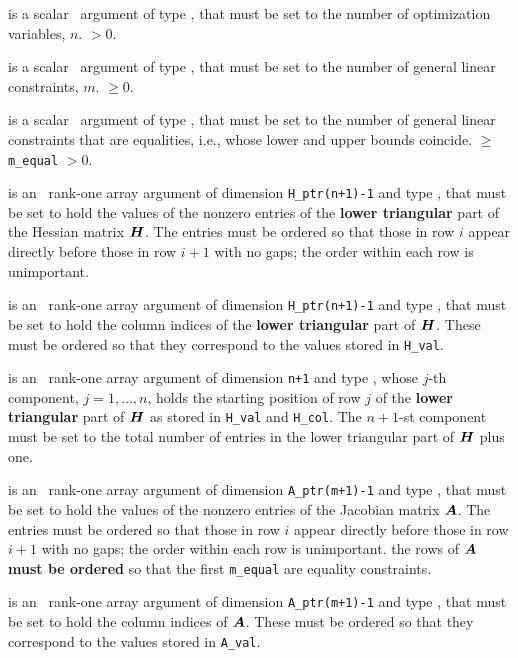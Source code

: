 \documentclass{galahad}
\begin{document}
\begin{description}
 is a scalar \intentin\ argument of type \integer,
 that must be set  to the number of optimization variables, $n$.
 $> 0$.

 is a scalar \intentin\ argument of type \integer,
 that must be set to the number of general linear constraints, $m$.
 $\geq 0$.

 is a scalar \intentin\ argument of type \integer,
 that must be set to the number of general linear constraints that
 are equalities, i.e., whose lower and upper bounds coincide.
 $\geq$ {\tt m\_equal} $> 0$.

 is an \intentin\  rank-one array argument
of dimension {\tt H\_ptr(n+1)-1} and type \realdp, that must be set
to hold the values of the nonzero entries of the {\bf lower triangular} part
of the Hessian matrix ${\bm{H}}$. The entries must be ordered so that those
in row $i$ appear directly before those in row $i+1$ with no gaps;
the order within each row is unimportant.

 is an \intentin\ rank-one array argument
of dimension {\tt H\_ptr(n+1)-1} and type \integer, that must be set
to hold the column indices of the {\bf lower triangular} part of
${\bm{H}}$. These must be ordered so that they correspond to the values stored
in {\tt H\_val}.

 is an \intentin\ rank-one array argument
of dimension {\tt n+1} and type \integer,
whose $j$-th component, $j = 1, \ldots , n$, holds the
starting position of row $j$ of the {\bf lower triangular} part of
${\bm{H}}$ as stored in {\tt H\_val} and {\tt H\_col}. The $n+1$-st
component must be set to the total number of entries in the lower
triangular part of ${\bm{H}}$ plus one.

 is an \intentin\  rank-one array argument
of dimension {\tt A\_ptr(m+1)-1} and type \realdp, that must be set
to hold the values of the nonzero entries
of the Jacobian matrix ${\bm{A}}$. The entries must be ordered so that those
in row $i$ appear directly before those in row $i+1$ with no gaps;
the order within each row is unimportant. 
\restriction the rows of ${\bm{A}}$ {\bf must be ordered} 
so that the first {\tt m\_equal} are equality constraints.

 is an \intentin\ rank-one array argument
of dimension {\tt A\_ptr(m+1)-1} and type \integer, that must be set
to hold the column indices of ${\bm{A}}$. These must be ordered so that they
correspond to the values stored in {\tt A\_val}.


\end{description}
\end{document}
